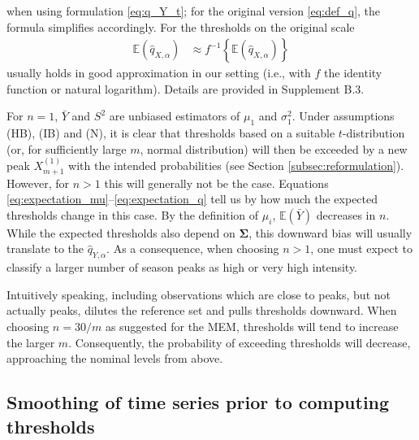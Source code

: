 \documentclass[12pt]{article}
\begin{document}
when using formulation \eqref{eq:q_Y_t}; for the original version \eqref{eq:def_q}, the formula simplifies accordingly. For the thresholds on the original scale
\begin{align}
\mathbb{E}(\hat{q}_{X, \alpha}) & \approx f^{-1}\left\{\mathbb{E}(\hat{q}_{X, \alpha})\right\}
\label{eq:expectation_q2}
\end{align}
usually holds in good approximation in our setting (i.e., with $f$ the identity function or natural logarithm). Details are provided in Supplement B.3.

For $n = 1$, $\bar{Y}$ and $S^2$ are unbiased estimators of $\mu_1$ and $\sigma^2_1$. Under assumptions (HB), (IB) and (N), it is clear that thresholds based on a suitable $t$-distribution (or, for sufficiently large $m$, normal distribution) will then be exceeded by a new peak $X_{m + 1}^{(1)}$ with the intended probabilities (see Section \ref{subsec:reformulation}). However, for $n > 1$ this will generally not be the case. Equations \eqref{eq:expectation_mu}--\eqref{eq:expectation_q} tell us by how much the expected thresholds change in this case. By the definition of $\mu_i$, $\mathbb{E}(\bar{Y})$ decreases in $n$. While the expected thresholds also depend on $\mathbf{\Sigma}$, this downward bias will usually translate to the $\hat{q}_{Y, \alpha}$. As a consequence, when choosing $n > 1$, one must expect to classify a larger number of season peaks as high or very high intensity. 

Intuitively speaking, including observations which are close to peaks, but not actually peaks, dilutes the reference set and pulls thresholds downward. When choosing $n = 30/m$ as suggested for the MEM, thresholds will tend to increase the larger $m$. Consequently, the probability of exceeding thresholds will decrease, approaching the nominal levels from above. 


\subsection{Smoothing of time series prior to computing thresholds}
\label{subsec:smoothing}
\end{document}
